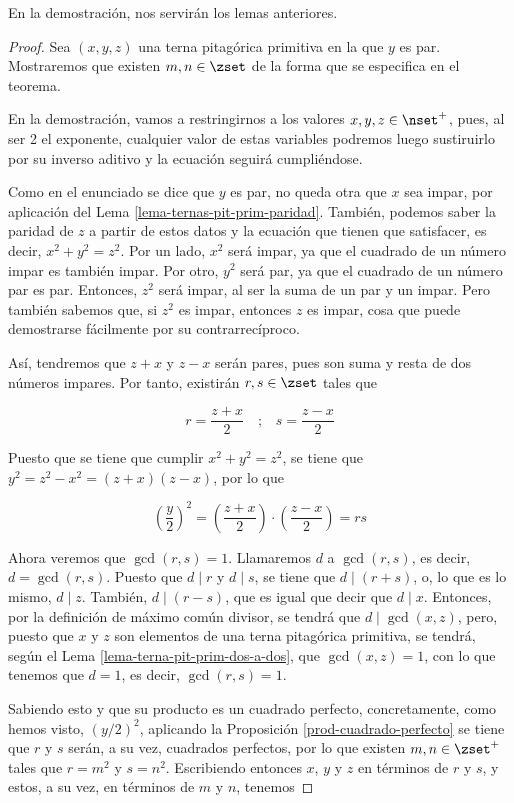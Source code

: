 En la demostración, nos servirán los lemas anteriores.

\begin{proof}
  Sea $(x, y, z)$ una terna pitagórica primitiva en la que $y$ es par.
  Mostraremos que existen $m, n \in \zset$ de la forma que se especifica en
  el teorema.

  En la demostración, vamos a restringirnos a los valores $x, y, z \in
  \nset^{+}$, pues, al ser 2 el exponente, cualquier valor de estas
  variables podremos luego sustiruirlo por su inverso aditivo y la ecuación
  seguirá cumpliéndose.

  Como en el enunciado se dice que $y$ es par, no queda otra que $x$ sea
  impar, por aplicación del Lema \ref{lema-ternas-pit-prim-paridad}.
  También, podemos saber la paridad de $z$ a partir de estos datos y la
  ecuación que tienen que satisfacer, es decir, $x^2 + y^2 = z^2$. Por un
  lado, $x^2$ será impar, ya que el cuadrado de un número impar es también
  impar. Por otro, $y^2$ será par, ya que el cuadrado de un número par es
  par. Entonces, $z^2$ será impar, al ser la suma de un par y un impar. Pero
  también sabemos que, si $z^2$ es impar, entonces $z$ es impar, cosa que
  puede demostrarse fácilmente por su contrarrecíproco.

  Así, tendremos que $z + x$ y $z - x$ serán pares, pues son suma y resta de
  dos números impares. Por tanto, existirán $r, s \in \zset$ tales que

  $$ r = \frac{z + x}{2} \quad \text{;} \quad s = \frac{z - x}{2} $$

  Puesto que se tiene que cumplir $x^2 + y^2 = z^2$, se tiene que $y^2 = z^2
  - x^2 = (z + x)(z - x)$, por lo que

  $$ \left( \frac{y}{2} \right)^2 = \left( \frac{z + x}{2} \right) \cdot
  \left( \frac{z - x}{2} \right) = rs $$

  Ahora veremos que $\gcd(r, s) = 1$. Llamaremos $d$ a $\gcd(r, s)$, es
  decir, $d = \gcd(r, s)$. Puesto que $d \mid r$ y $d \mid s$, se tiene que
  $d \mid (r + s)$, o, lo que es lo mismo, $d \mid z$. También, $d \mid (r -
  s)$, que es igual que decir que $d \mid x$. Entonces, por la definición de
  máximo común divisor, se tendrá que $d \mid \gcd(x, z)$, pero, puesto que
  $x$ y $z$ son elementos de una terna pitagórica primitiva, se tendrá,
  según el Lema \ref{lema-terna-pit-prim-dos-a-dos}, que $\gcd(x, z) = 1$,
  con lo que tenemos que $d = 1$, es decir, $\gcd(r, s) = 1$.

  Sabiendo esto y que su producto es un cuadrado perfecto, concretamente,
  como hemos visto, $(y/2)^2$, aplicando la Proposición
  \ref{prod-cuadrado-perfecto} se tiene que $r$ y $s$ serán, a su vez,
  cuadrados perfectos, por lo que existen $m, n \in \zset^{+}$ tales que $r
  = m^2$ y $s = n^2$. Escribiendo entonces $x$, $y$ y $z$ en términos de $r$
  y $s$, y estos, a su vez, en términos de $m$ y $n$, tenemos


\end{proof}

